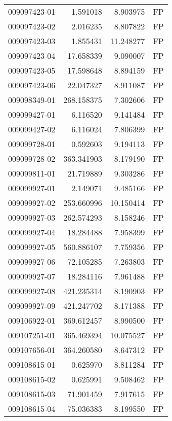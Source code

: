 \begin{tabular}{lrrl}
009097423-01 &    1.591018 &       8.903975 &   FP \\
009097423-02 &    2.016235 &       8.807822 &   FP \\
009097423-03 &    1.855431 &      11.248277 &   FP \\
009097423-04 &   17.658339 &       9.090007 &   FP \\
009097423-05 &   17.598648 &       8.894159 &   FP \\
009097423-06 &   22.047327 &       8.911087 &   FP \\
009098349-01 &  268.158375 &       7.302606 &   FP \\
009099427-01 &    6.116520 &       9.141484 &   FP \\
009099427-02 &    6.116024 &       7.806399 &   FP \\
009099728-01 &    0.592603 &       9.194113 &   FP \\
009099728-02 &  363.341903 &       8.179190 &   FP \\
009099811-01 &   21.719889 &       9.303286 &   FP \\
009099927-01 &    2.149071 &       9.485166 &   FP \\
009099927-02 &  253.660996 &      10.150414 &   FP \\
009099927-03 &  262.574293 &       8.158246 &   FP \\
009099927-04 &   18.284488 &       7.958399 &   FP \\
009099927-05 &  560.886107 &       7.759356 &   FP \\
009099927-06 &   72.105285 &       7.263803 &   FP \\
009099927-07 &   18.284116 &       7.961488 &   FP \\
009099927-08 &  421.235314 &       8.190903 &   FP \\
009099927-09 &  421.247702 &       8.171388 &   FP \\
009106922-01 &  369.612457 &       8.990500 &   FP \\
009107251-01 &  365.469394 &      10.075527 &   FP \\
009107656-01 &  364.260580 &       8.647312 &   FP \\
009108615-01 &    0.625970 &       8.811284 &   FP \\
009108615-02 &    0.625991 &       9.508462 &   FP \\
009108615-03 &   71.901459 &       7.917615 &   FP \\
009108615-04 &   75.036383 &       8.199550 &   FP \\

\end{tabular}
